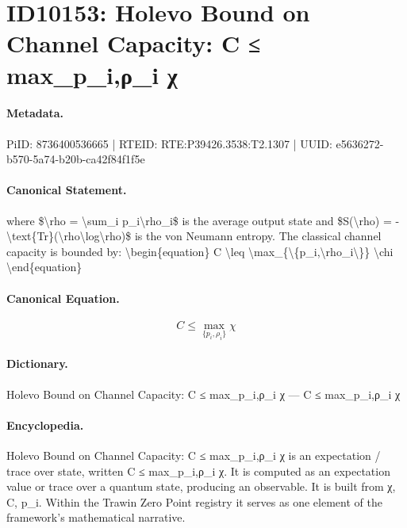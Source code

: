 \section*{ID10153: Holevo Bound on Channel Capacity: C ≤ max\_p\_i,ρ\_i χ}
\paragraph{Metadata.}
PiID: 8736400536665 | RTEID: RTE:P39426.3538:T2.1307 | UUID: e5636272-b570-5a74-b20b-ca42f84f1f5e

\paragraph{Canonical Statement.}
where \$\textbackslash{}rho = \textbackslash{}sum\_i p\_i\textbackslash{}rho\_i\$ is the average output state and \$S(\textbackslash{}rho) = -\textbackslash{}text\{Tr\}(\textbackslash{}rho\textbackslash{}log\textbackslash{}rho)\$ is the von Neumann entropy. The classical channel capacity is bounded by: \textbackslash{}begin\{equation\} C \textbackslash{}leq \textbackslash{}max\_\{\textbackslash{}\{p\_i,\textbackslash{}rho\_i\textbackslash{}\}\} \textbackslash{}chi \textbackslash{}end\{equation\}

\paragraph{Canonical Equation.}
\[
C \leq \max_{\{p_i,\rho_i\}} \chi
\]

\paragraph{Dictionary.}
Holevo Bound on Channel Capacity: C ≤ max\_p\_i,ρ\_i χ — C ≤ max\_p\_i,ρ\_i χ

\paragraph{Encyclopedia.}
Holevo Bound on Channel Capacity: C ≤ max\_p\_i,ρ\_i χ is an expectation / trace over state, written C ≤ max\_p\_i,ρ\_i χ. It is computed as an expectation value or trace over a quantum state, producing an observable. It is built from χ, C, p\_i. Within the Trawin Zero Point registry it serves as one element of the framework's mathematical narrative.
